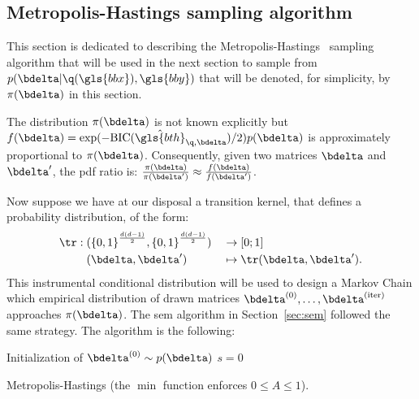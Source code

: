 \subsection{Metropolis-Hastings sampling algorithm}

This section is dedicated to describing the Metropolis-Hastings~\cite{hastings1970monte} sampling algorithm that will be used in the next section to sample from $p(\bdelta | \q(\gls{bbx}),\gls{bby})$ that will be denoted, for simplicity, by $\pi(\bdelta)$ in this section.

The distribution $\pi(\bdelta)$ is not known explicitly but $f(\bdelta) = \exp(-\text{BIC}(\hat{\gls{bth}}_{\q,\bdelta})/2) p(\bdelta)$ is approximately proportional to $\pi(\bdelta)$. Consequently, given two matrices $\bdelta$ and $\bdelta'$, the \gls{pdf} ratio is: $\frac{\pi(\bdelta)}{\pi(\bdelta')} \approx \frac{f(\bdelta)}{f(\bdelta')}$.

Now suppose we have at our disposal a transition kernel, that defines a probability distribution, of the form:
\begin{alignat}{2}
\tr: \; & ({\{0,1\}}^{\frac{d(d-1)}{2}},{\{0,1\}}^{\frac{d(d-1)}{2}}) && \to [0;1] \nonumber \\ 
& (\bdelta,\bdelta') && \mapsto \tr(\bdelta,\bdelta'). \nonumber
\end{alignat}
This instrumental conditional distribution will be used to design a Markov Chain which empirical distribution of drawn matrices $\bdelta^{(0)}, \dots, \bdelta^{(\text{iter})}$ approaches $\pi(\bdelta)$. The \gls{sem} algorithm in Section~\ref{sec:sem} followed the same strategy. The algorithm is the following:

\begin{algorithm}[H]
 Initialization of $ \bdelta^{(0)} \sim p(\bdelta)$\;
 $s = 0$\;
\caption{\label{metropolis} Metropolis-Hastings (the $\min$ function enforces $0 \leq A \leq 1$).}
\label{alg:metro}
\end{algorithm}

